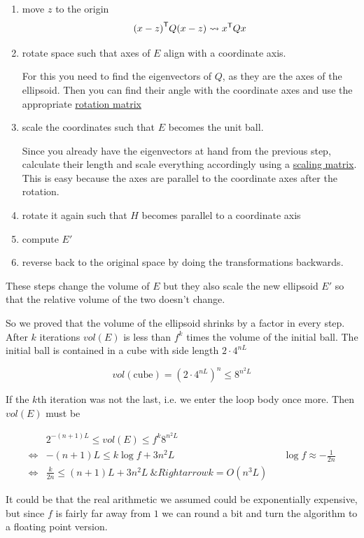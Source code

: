 \begin{enumerate}
\item move $z$ to the origin
\[{(x-z)}^\text{\upshape \sffamily T}Q(x-z) \rightsquigarrow {x}^\text{\upshape \sffamily T}Qx\]
\item rotate space such that axes of $E$ align with a coordinate axis. 

For this you need to find the eigenvectors of $Q$, as they are the axes of the ellipsoid. Then you can find their angle with the coordinate axes and use the appropriate \href{http://en.wikipedia.org/wiki/Rotation\_matrix}{rotation matrix}
\item scale the coordinates such that $E$ becomes the unit ball.

Since you already have the eigenvectors at hand from the previous step, calculate their length and scale everything accordingly using a \href{http://en.wikipedia.org/wiki/Scaling\_matrix}{scaling matrix}. This is easy because the axes are parallel to the coordinate axes after the rotation.
\item rotate it again such that $H$ becomes parallel to a coordinate axis
\item compute $E'$
\item reverse back to the original space by doing the transformations backwards.
\end{enumerate}

These steps change the volume of $E$ but they also scale the new ellipsoid $E'$ so that the relative volume of the two doesn't change.

So we proved that the volume of the ellipsoid shrinks by a factor in every step. After $k$ iterations $vol(E)$ is less than $f^k$ times the volume of the initial ball. The initial ball is contained in a cube with side length $2\cdot 4^{nL}$

\[vol(\text{cube}) = (2 \cdot 4^{nL})^n \leq 8^{n^2L}\]

If the $k$th iteration was not the last, i.e. we enter the loop body once more. Then $vol(E)$ must be

\begin{align*}
&2^{-(n+1)L} \leq vol(E) \leq f^k 8^{n^2L} \\
\Leftrightarrow & -(n+1)L  \leq k\log f + 3n^2 L && \log f \approx -\frac{1}{2n}\\
\Leftrightarrow & \frac{k}{2n} \leq (n+1)L+3n^2L \
\&Rightarrow k = O(n^3L)
\end{align*}

It could be that the real arithmetic we assumed could be exponentially expensive, but since $f$ is fairly far away from $1$ we can round a bit and turn the algorithm to a floating point version.

